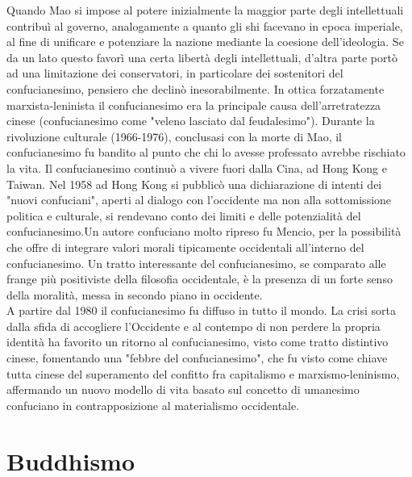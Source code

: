 \documentclass[10pt,a4paper]{report}
\begin{document}
Quando Mao si impose al potere inizialmente la maggior parte degli intellettuali contribuì al governo, analogamente a quanto gli shi facevano in epoca imperiale, al fine di unificare e potenziare la nazione mediante la coesione dell'ideologia. Se da un lato questo favorì una certa libertà degli intellettuali, d'altra parte portò ad una limitazione dei conservatori, in particolare dei sostenitori del confucianesimo, pensiero che declinò inesorabilmente. In ottica forzatamente marxista-leninista il confucianesimo era la principale causa dell'arretratezza cinese (confucianesimo come "veleno lasciato dal feudalesimo"). Durante la rivoluzione culturale (1966-1976), conclusasi con la morte di Mao, il confucianesimo fu bandito al punto che chi lo avesse professato avrebbe rischiato la vita. Il confucianesimo continuò a vivere fuori dalla Cina, ad Hong Kong e Taiwan. Nel 1958 ad Hong Kong si pubblicò una dichiarazione di intenti dei "nuovi confuciani", aperti al dialogo con l'occidente ma non alla sottomissione politica e culturale, si rendevano conto dei limiti e delle potenzialità del confucianesimo.Un autore confuciano molto ripreso fu Mencio, per la possibilità che offre di integrare valori morali tipicamente occidentali all'interno del confucianesimo. Un tratto interessante del confucianesimo, se comparato alle frange più positiviste della filosofia occidentale, è la presenza di un forte senso della moralità, messa in secondo piano in occidente. \\
A partire dal 1980 il confucianesimo fu diffuso in tutto il mondo. La crisi sorta dalla sfida di accogliere l'Occidente e al contempo di non perdere la propria identità ha favorito un ritorno al confucianesimo, visto come tratto distintivo cinese, fomentando una "febbre del confucianesimo", che fu visto come chiave tutta cinese del superamento del confitto fra capitalismo e marxismo-leninismo, affermando un nuovo modello di vita basato sul concetto di umanesimo confuciano in contrapposizione al materialismo occidentale.

\chapter{Buddhismo}
\end{document}
